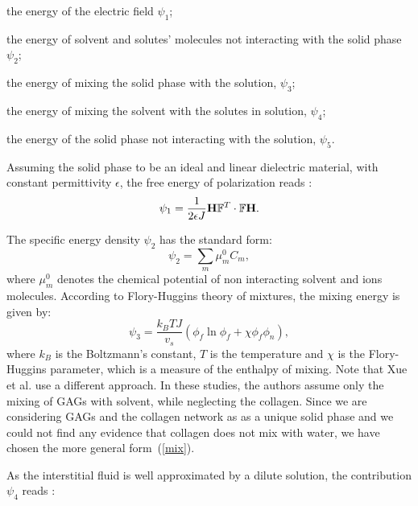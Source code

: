 \begin{enumerate}
	{\indentitem\item[\textbullet] the energy of the electric field $\psi_1$;}
	{\indentitem \item[\textbullet] the energy of solvent and solutes' molecules not interacting with the solid phase $\psi_2$;}
	{\indentitem\item[\textbullet] the energy of mixing the solid phase with the solution, $\psi_3$;}
	{\indentitem\item[\textbullet] the energy of mixing the solvent with the solutes in solution, $\psi_4$;}
	{\indentitem\item[\textbullet] the energy of the solid phase not interacting with the solution, $\psi_5$.}
\end{enumerate}

Assuming the solid phase to be an ideal and linear dielectric material, with constant permittivity $\epsilon$, the free energy of polarization reads \cite{DROZDOV+,Reviewpolyel}:
\begin{gather}
\psi_1 = \frac{1}{2\epsilon J} \mathbf{H}\mathbb{F}^T \cdot \mathbb{F} \mathbf{H}.\label{psi1}
\end{gather}

The specific energy density $\psi_2$ has the standard form:
\begin{equation}
\psi_2 = \sum\limits_{m} \mu^0_m C_m,
\end{equation} 
where $\mu^0_m$ denotes the chemical potential of non interacting solvent and ions molecules. According to Flory-Huggins theory \cite{flory,hug} of mixtures, the mixing energy is given by:
\begin{equation}
\psi_3 = \frac{k_B T J}{v_s} \left(\phi_f \ln \phi_f + \chi \phi_f \phi_n\right),\label{mix}
\end{equation}
where $k_B$ is the Boltzmann's constant, $T$ is the temperature and $\chi$ is the Flory-Huggins parameter, which is a measure of the enthalpy of mixing. Note that Xue et al.\cite{ecm1,ecm2} use a different approach. In these studies, the authors assume only the mixing of GAGs with solvent, while neglecting the collagen. Since we are considering GAGs and the collagen network as as a unique solid phase and we could not find any evidence that collagen does not mix with water, we have chosen the more general form~(\ref{mix}).

As the interstitial fluid is well approximated by a dilute solution, the contribution $\psi_4$ reads \cite{Reviewpolyel,ecm1,ecm2}:

